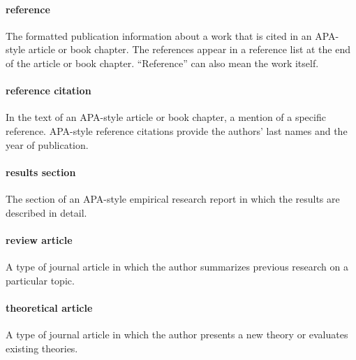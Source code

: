 \documentclass[
]{krantz}
\begin{document}
\hypertarget{reference}{%
\paragraph*{reference}\label{reference}}

The formatted publication information about a work that is cited in an APA-style article or book chapter. The references appear in a reference list at the end of the article or book chapter. ``Reference'' can also mean the work itself.

\hypertarget{reference-citation}{%
\paragraph*{reference citation}\label{reference-citation}}

In the text of an APA-style article or book chapter, a mention of a specific reference. APA-style reference citations provide the authors' last names and the year of publication.

\hypertarget{results-section}{%
\paragraph*{results section}\label{results-section}}

The section of an APA-style empirical research report in which the results are described in detail.

\hypertarget{review-article-1}{%
\paragraph*{review article}\label{review-article-1}}

A type of journal article in which the author summarizes previous research on a particular topic.

\hypertarget{theoretical-article-1}{%
\paragraph*{theoretical article}\label{theoretical-article-1}}

A type of journal article in which the author presents a new theory or evaluates existing theories.
\end{document}
